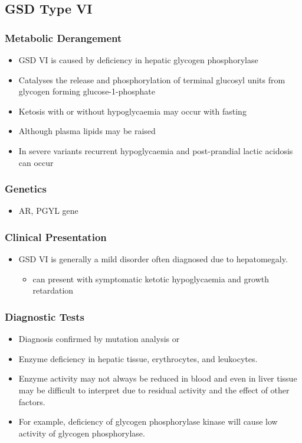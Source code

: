 \documentclass{scrartcl}
\begin{document}
\subsection{GSD Type VI}
\label{sec:org22351e0}
\subsubsection{Metabolic Derangement}
\label{sec:org211605d}
\begin{itemize}
\item GSD VI is caused by deficiency in hepatic glycogen phosphorylase
\item Catalyses the release and phosphorylation of terminal glucosyl units
from glycogen forming glucose-1-phosphate
\item Ketosis with or without hypoglycaemia may occur with fasting
\item Although plasma lipids may be raised
\item In severe variants recurrent hypoglycaemia and post-prandial lactic
acidosis can occur
\end{itemize}
\subsubsection{Genetics}
\label{sec:org7f2fddb}
\begin{itemize}
\item AR, PGYL gene
\end{itemize}

\subsubsection{Clinical Presentation}
\label{sec:org9744d2f}
\begin{itemize}
\item GSD VI is generally a mild disorder often diagnosed due to hepatomegaly.
\begin{itemize}
\item can present with symptomatic ketotic hypoglycaemia and growth retardation
\end{itemize}
\end{itemize}
\subsubsection{Diagnostic Tests}
\label{sec:org5c78f63}
\begin{itemize}
\item Diagnosis confirmed by mutation analysis or
\item Enzyme deficiency in hepatic tissue, erythrocytes, and leukocytes.
\item Enzyme activity may not always be reduced in blood and even in liver
tissue may be difficult to interpret due to residual activity and
the effect of other factors.
\item For example, deficiency of glycogen phosphorylase kinase will cause
low activity of glycogen phosphorylase.
\end{itemize}
\end{document}
